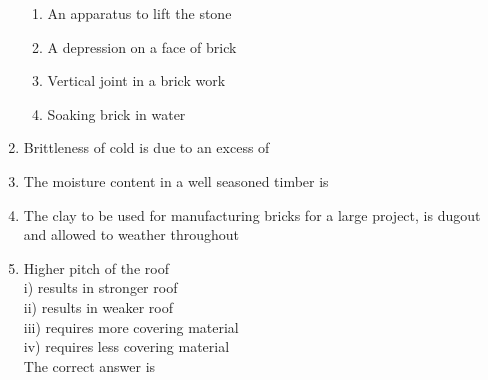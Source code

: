 \documentclass[11pt,a4paper]{article}
\begin{document}
\begin{enumerate}
\begin{enumerate}[label=\Alph*.]
\item{An apparatus to lift the stone}
\item{A depression on a face of brick}
\item{Vertical joint in a brick work}
\item{Soaking brick in water}
\end{enumerate}
\item{Brittleness of cold is due to an excess of}
\\
\item{The moisture content in a well seasoned timber is}
\\
\item{The clay to be used for manufacturing bricks for a large project, is dugout and allowed to weather throughout}
\\
\item{Higher pitch of the roof \\
i) results in stronger roof \\
ii) results in weaker roof \\
iii) requires more covering material \\
iv) requires less covering material \\
The correct answer is \\
}
\\
\end{enumerate}
\end{document}
